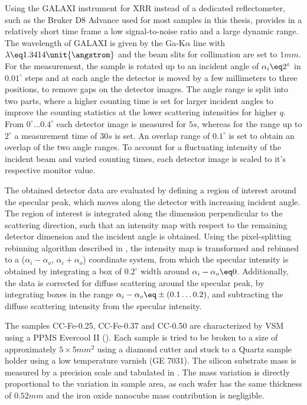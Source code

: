 \documentclass[\main/dresen_thesis.tex]{subfiles}
\begin{document}
    Using the GALAXI instrument for XRR instead of a dedicated reflectometer, such as the Bruker D8 Advance used for most samples in this thesis, provides in a relatively short time frame a low signal-to-noise ratio and a large dynamic range.
    The wavelength of GALAXI is given by the Ga-K$\alpha$ line with $\lambda \eq 1.3414 \unit{\angstrom}$ and the beam slits for collimation are set to $1 \unit{mm}$.
    For the measurement, the sample is rotated up to an incident angle of $\alpha_i \eq 2^\circ$ in $0.01 ^\circ$ steps and at each angle the detector is moved by a few millimeters to three positions, to remove gaps on the detector images.
    The angle range is split into two parts, where a higher counting time is set for larger incident angles to improve the counting statistics at the lower scattering intensities for higher $q$.
    From $0 ^\circ \ldots 0.4 ^\circ$ each detector image is measured for $5 \unit{s}$, whereas for the range up to $2 ^\circ$ a measurement time of $30 \unit{s}$ is set.
    An overlap range of $0.1 ^\circ$ is set to obtain an overlap of the two angle ranges.
    To account for a fluctuating intensity of the incident beam and varied counting times, each detector image is scaled to it's respective monitor value.

    The obtained detector data are evaluated by defining a region of interest around the specular peak, which moves along the detector with increasing incident angle.
    The region of interest is integrated along the dimension perpendicular to the scattering direction, such that an intensity map with respect to the remaining detector dimension and the incident angle is obtained.
    Using the pixel-splitting rebinning algorithm described in , the intensity map is transformed and rebinned to a ($\alpha_i - \alpha_o$, $\alpha_i+\alpha_o$) coordinate system, from which the specular intensity is obtained by integrating a box of $0.2 ^\circ$ width around $\alpha_i - \alpha_o \eq 0$.
    Additionally, the data is corrected for diffuse scattering around the specular peak, by integrating boxes in the range $\alpha_i - \alpha_o \eq \pm (0.1 \ldots 0.2)$, and subtracting the diffuse scattering intensity from the specular intensity.


    The samples CC-Fe-0.25, CC-Fe-0.37 and CC-0.50 are characterized by VSM using a PPMS Evercool II ().
    Each sample is tried to be broken to a size of approximately $5 \times 5 \unit{mm^2}$ using a diamond cutter and stuck to a Quartz sample holder using a low temperature varnish (GE 7031).
    The silicon substrate mass is measured by a precision scale and tabulated in .
    The mass variation is directly proportional to the variation in sample area, as each wafer has the same thickness of $0.52 \unit{mm}$ and the iron oxide nanocube mass contribution is negligible.
\end{document}
